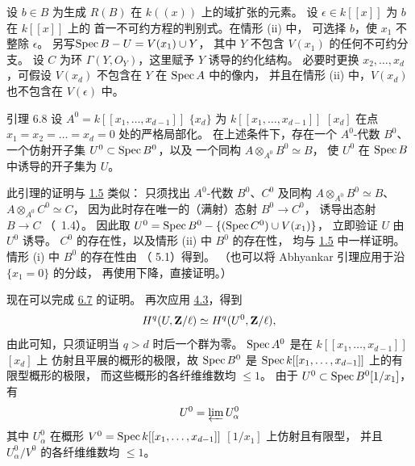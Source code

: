 设 $b\in B$ 为生成 $R(B)$ 在 $k((x))$ 上的域扩张的元素。
设 $\epsilon \in k[[x]]$ 为 $b$ 在 $k[[x]]$ 上的
首一不可约方程的判别式。在情形 (ii) 中，
可选择 $b$，使 $x_{1}$ 不整除 $\epsilon$。
另写\pageoriginale $\operatorname{Spec} B-U=V(x_{1})\cup Y$，
其中 $Y$ 不包含 $V(x_{1})$ 的任何不可约分支。
设 $C$ 为环 $\Gamma(Y,O_{Y})$，这里赋予 $Y$ 诱导的约化结构。
必要时更换 $x_{2},\ldots,x_{d}$，可假设
$V(x_{d})$ 不包含在 $Y$ 在 $\operatorname{Spec} A$ 中的像内，
并且在情形 (ii) 中，$V(x_{d})$ 也不包含在 $V(\epsilon)$ 中。

\hypertarget{sga4.exp.XIX.lemma.6.8}{}\begin{enonce*}{引理 6.8}
设 $A^{0}=k[[x_{1},\ldots,x_{d-1}]]$ $\{x_{d}\}$ 为
$k[[x_{1},\ldots,x_{d-1}]]$ $[x_{d}]$ 在点
$x_{1}=x_{2}=\ldots=x_{d}=0$ 处的严格局部化。
在上述条件下，存在一个 $A^{0}$-代数 $B^{0}$、
一个仿射开子集 $U^{0}\subset \operatorname{Spec} B^{0}$，以及
一个同构 $A\otimes_{A^{0}}B^{0}\simeq B$，
使 $U^{0}$ 在 $\operatorname{Spec} B$ 中诱导的开子集为 $U$。
\end{enonce*}

此引理的证明与 \hyperref[XIX.lem1.5]{1.5} 类似：
只须找出 $A^{0}$-代数 $B^{0}$、$C^{0}$ 及同构
$A\otimes_{A^{0}}B^{0}\simeq B$、$A\otimes_{A^{0}}C^{0}\simeq C$，
因为此时存在唯一的（满射）态射 $B^{0}\rightarrow C^{0}$，
诱导出态射 $B\rightarrow C$
（\cite{sga4.exp.XIX.bib.3}~1.4）。
因此取 $U^{0}=\operatorname{Spec} B^{0}-\{(\operatorname{Spec} C^{0})\cup V(x_{1})\}$，
立即验证 $U$ 由 $U^{0}$ 诱导。
$C^{0}$ 的存在性，以及情形 (ii) 中 $B^{0}$ 的存在性，
均与 \hyperref[XIX.lem1.5]{1.5} 中一样证明。
情形 (i) 中 $B^{0}$ 的存在性由
（\cite{sga4.exp.XIX.bib.3} 5.1）得到。
（也可以将 Abhyankar 引理应用于沿 $\{x_{1}=0\}$ 的分歧，
再使用下降，直接证明。）

现在可以完成 \hyperref[XIX.lem6.7]{6.7} 的证明。
再次应用 \hyperref[XIX.cor4.3]{4.3}，得到
$$
H^{q}(U,\mathbf{Z}/\ell)\simeq H^{q}(U^{0},\mathbf{Z}/\ell){},
$$
由此\pageoriginale 可知，只须证明当 $q>d$ 时后一个群为零。
$\operatorname{Spec} A^{0}$ 是在 $k[[x_{1},\ldots,x_{d-1}]]$ $[x_{d}]$ 上
仿射且平展的概形的极限，故 $\operatorname{Spec} B^{0}$ 是
$\operatorname{Spec} k[[x_{1},\dots,x_{d-1}]]$ 上的有限型概形的极限，
而这些概形的各纤维维数均 $\leq 1$。
由于 $U^{0}\subset \operatorname{Spec} B^{0}[1/x_{1}]$，有
$$
U^{0}=\varprojlim U^{0}_{\alpha}
$$
其中 $U^{0}_{\alpha}$ 在概形
$V^{0}=\operatorname{Spec} k[[x_{1},\dots, x_{d-1}]]$ $[1/x_{1}]$ 上仿射且有限型，
并且 $U^{0}_{\alpha}/V^{0}$ 的各纤维维数均 $\leq 1$。

